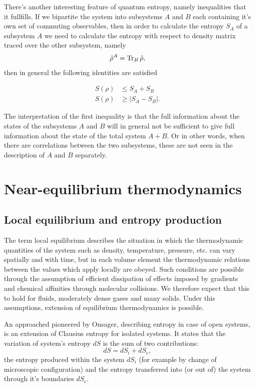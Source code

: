 \documentclass[a4paper,12pt]{article}
\begin{document}
There's another interesting feature of quantum entropy, namely inequalities that it fullfills.
If we bipartite the system into subsystems $A$ and $B$ each containing it's own set of commuting observables, then in order to calculate the entropy $S_A$ of a subsystem $A$ we need to calculate the entropy with respect to density matrix traced over the other subsystem, namely
\begin{equation}
  \hat{\rho}^A = \Tr_B \hat{\rho},
\end{equation}
then in general the following identities are satisfied

\begin{equation}
\begin{aligned}
	S(\rho) &\leq S_A + S_B	\\
	S(\rho) &\geq \left| S_A - S_B \right|.
\end{aligned}
\end{equation}

The interpretation of the first inequality is that the full information about the states of the subsystems $A$ and $B$ will in general not be sufficient to give full information about the state of the total system $A+B$. Or in other words, when there are correlations between the two subsystems, these are not seen in the description of $A$ and $B$ separately. 

\section{Near-equilibrium thermodynamics}
\label{NearEquilibrium}
\subsection{Local equilibrium and entropy production}

The term local equilibrium describes the situation in which the thermodynamic quantities of the system such as density, temperature, pressure, etc. can vary spatially and with time, but in each volume element the thermodynamic relations between the values which apply locally are obeyed. 
Such conditions are possible through the assumption of efficient dissipation of effects imposed by gradients and chemical affinities through molecular collisions. We therefore expect that this to hold for fluids, moderately dense gases and many solids.
Under this assumptions, extension of equilibrium thermodynamics is possible\cite{Anonymous:NJxQY1gt}.

An approached pioneered by Onsager, describing entropy in case of open systems, is an extension of Clausius entropy for isolated systems. It states that the variation of system's entropy $dS$ is the sum of two contributions: 
\begin{equation}
\label{OpenSystemEntropy}
  	dS=dS_i+dS_e,
\end{equation}
the entropy produced within the system $dS_i$ (for example by change of microscopic configuration) and the entropy transferred into (or out of) the system through it's boundaries $dS_e$.
\end{document}
